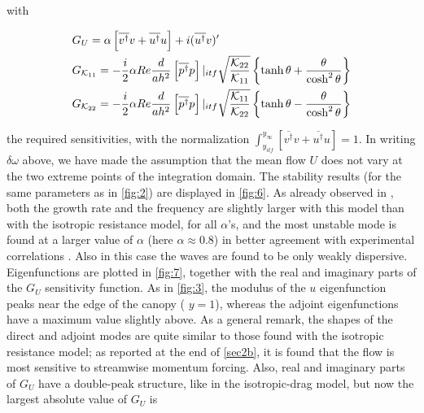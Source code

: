 with

\begin{equation}
\begin{split}
& G_U = \alpha  \left[  \overline{v^{\dagger}} v +  \overline{u^{\dagger}} u \right] + i ( \overline{u^{\dagger}} v)'  \vspace{0.3cm}\\
& G_{\mathcal{K}_{11}} = -\dfrac{i}{2} \alpha Re \dfrac{d}{a h^2}  \left[  \overline{p^{\dagger}} p \right]|_{itf} \sqrt{\dfrac{\mathcal{K}_{22}}{\mathcal{K}_{11}}} \left\lbrace \tanh \theta + \dfrac{\theta}{\cosh^2 \theta}\right\rbrace	\vspace{0.3cm}\\
& G_{\mathcal{K}_{22}} = -\dfrac{i}{2} \alpha Re \dfrac{d}{a h^2}  \left[  \overline{p^{\dagger}} p \right]|_{itf} \sqrt{\dfrac{\mathcal{K}_{11}}{\mathcal{K}_{22}}} \left\lbrace \tanh \theta - \dfrac{\theta}{\cosh^2 \theta}\right\rbrace
\end{split}
\end{equation}


the required sensitivities, with the normalization  $\int_{y_{itf}}^{y_{\infty}} \left[  \overline{v^{\dagger}} v +  \overline{u^{\dagger}} u \right] = 1$.
In writing $\delta \omega$ above, we have made the assumption that the mean flow $U$ does not vary at the two extreme points of the
integration domain.
The stability results (for the same parameters as in \ref{fig:2}) are displayed in \ref{fig:6}. As already
observed in \citet{zampogna2016instability}, both the growth rate and the frequency are slightly larger with this model than
with the isotropic resistance model, for all $\alpha$’s, and the most unstable mode is found at a larger
value of $\alpha$ (here $\alpha \approx 0.8$) in better agreement with experimental correlations \citet{zampogna2016instability} \citet{raupach1996coherent}.  Also in this case the
waves are found to be only weakly dispersive.
Eigenfunctions are plotted in \ref{fig:7}, together with the real and imaginary parts of the $G_U$
sensitivity function. As in \ref{fig:3}, the modulus of the $u$ eigenfunction peaks near the edge of the
canopy ( $y = 1$), whereas the adjoint eigenfunctions have a maximum value slightly above. As a
general remark, the shapes of the direct and adjoint modes are quite similar to those found with
the isotropic resistance model; as reported at the end of \ref{sec2b}, it is found that the flow
is most sensitive to streamwise momentum forcing. Also, real and imaginary parts of $G_U$ have a
double-peak structure, like in the isotropic-drag model, but now the largest absolute value of $G_U$ is

